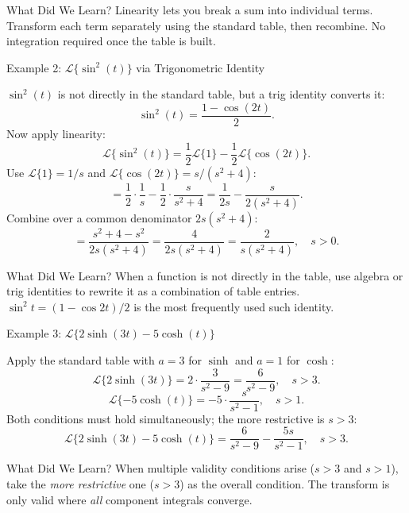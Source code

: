 \documentclass[12pt,a4paper]{article}
\begin{document}
\begin{learnbox}{What Did We Learn?}
Linearity lets you break a sum into individual terms. Transform each term separately using
the standard table, then recombine. No integration required once the table is built.
\end{learnbox}

\begin{infobox}{Example 2: $\mathcal{L}\{\sin^2(t)\}$ via Trigonometric Identity}

$\sin^2(t)$ is not directly in the standard table, but a trig identity converts it:
\[
  \sin^2(t) = \frac{1 - \cos(2t)}{2}.
\]
Now apply linearity:
\[
  \mathcal{L}\{\sin^2(t)\}
  = \frac{1}{2}\mathcal{L}\{1\} - \frac{1}{2}\mathcal{L}\{\cos(2t)\}.
\]
Use $\mathcal{L}\{1\} = 1/s$ and $\mathcal{L}\{\cos(2t)\} = s/(s^2+4)$:
\[
  = \frac{1}{2} \cdot \frac{1}{s} - \frac{1}{2} \cdot \frac{s}{s^2+4}
  = \frac{1}{2s} - \frac{s}{2(s^2+4)}.
\]
Combine over a common denominator $2s(s^2+4)$:
\[
  = \frac{s^2+4 - s^2}{2s(s^2+4)} = \frac{4}{2s(s^2+4)} = \frac{2}{s(s^2+4)}, \quad s > 0.
\]
\end{infobox}

\begin{learnbox}{What Did We Learn?}
When a function is not directly in the table, use algebra or trig identities to rewrite it
as a combination of table entries. $\sin^2 t = (1 - \cos 2t)/2$ is the most frequently
used such identity.
\end{learnbox}

\begin{infobox}{Example 3: $\mathcal{L}\{2\sinh(3t) - 5\cosh(t)\}$}

Apply the standard table with $a = 3$ for $\sinh$ and $a = 1$ for $\cosh$:
\[
  \mathcal{L}\{2\sinh(3t)\}
  = 2 \cdot \frac{3}{s^2 - 9} = \frac{6}{s^2 - 9}, \quad s > 3.
\]
\[
  \mathcal{L}\{-5\cosh(t)\}
  = -5 \cdot \frac{s}{s^2 - 1}, \quad s > 1.
\]
Both conditions must hold simultaneously; the more restrictive is $s > 3$:
\[
  \mathcal{L}\{2\sinh(3t) - 5\cosh(t)\}
  = \frac{6}{s^2-9} - \frac{5s}{s^2-1}, \quad s > 3.
\]
\end{infobox}

\begin{learnbox}{What Did We Learn?}
When multiple validity conditions arise ($s > 3$ and $s > 1$), take the \emph{more
restrictive} one ($s > 3$) as the overall condition. The transform is only valid where
\emph{all} component integrals converge.
\end{learnbox}
\end{document}
